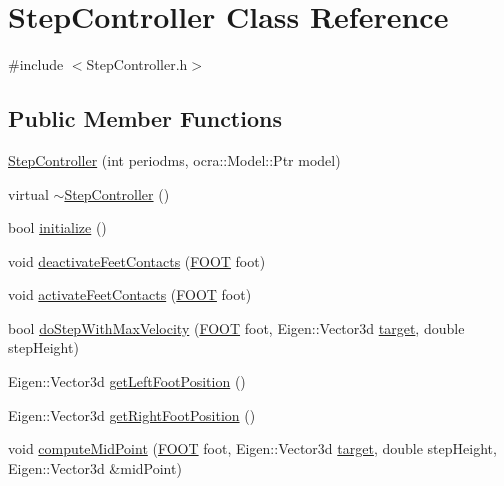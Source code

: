 \hypertarget{classStepController}{\section{\-Step\-Controller \-Class \-Reference}
\label{classStepController}
}


{\ttfamily \#include $<$\-Step\-Controller.\-h$>$}

\subsection*{\-Public \-Member \-Functions}
\begin{DoxyCompactItemize}
\item 
\hyperlink{classStepController_a80b7436dcb5c1d4a3e04f805b8f8f32a}{\-Step\-Controller} (int periodms, ocra\-::\-Model\-::\-Ptr model)
\item 
virtual \hyperlink{classStepController_ae2033c937309c104539b6758346529d5}{$\sim$\-Step\-Controller} ()
\item 
bool \hyperlink{classStepController_a8f061f201c651d920ca02f7daa07adfe}{initialize} ()
\item 
void \hyperlink{classStepController_ada72856c76030cc22ebb18f368f829f1}{deactivate\-Feet\-Contacts} (\hyperlink{utils_8h_a4b6a8e135f90bd56e5a57a60efb42529}{\-F\-O\-O\-T} foot)
\item 
void \hyperlink{classStepController_a6184693a199603c945250a58ceb8d9a2}{activate\-Feet\-Contacts} (\hyperlink{utils_8h_a4b6a8e135f90bd56e5a57a60efb42529}{\-F\-O\-O\-T} foot)
\item 
bool \hyperlink{classStepController_a1bfcb66d504440f0cc7383ad688dad5c}{do\-Step\-With\-Max\-Velocity} (\hyperlink{utils_8h_a4b6a8e135f90bd56e5a57a60efb42529}{\-F\-O\-O\-T} foot, \-Eigen\-::\-Vector3d \hyperlink{classStepController_a588d5b149eb4a6877e89ecff37d0f91d}{target}, double step\-Height)
\item 
\-Eigen\-::\-Vector3d \hyperlink{classStepController_aa168e028dc086859400e1c93c0becdd2}{get\-Left\-Foot\-Position} ()
\item 
\-Eigen\-::\-Vector3d \hyperlink{classStepController_aaa7e389226a30582be8c8a724661a921}{get\-Right\-Foot\-Position} ()
\item 
void \hyperlink{classStepController_a0dcf2ec0d0fdf1fd9d86878fffd4e5ad}{compute\-Mid\-Point} (\hyperlink{utils_8h_a4b6a8e135f90bd56e5a57a60efb42529}{\-F\-O\-O\-T} foot, \-Eigen\-::\-Vector3d \hyperlink{classStepController_a588d5b149eb4a6877e89ecff37d0f91d}{target}, double step\-Height, \-Eigen\-::\-Vector3d \&mid\-Point)

\end{DoxyCompactItemize}
